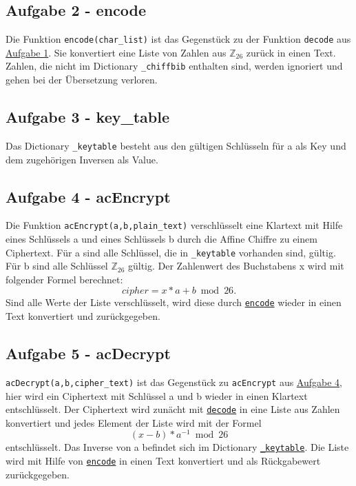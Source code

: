 \documentclass[12pt]{article}
\begin{document}
	\newpage
	
			
			
		\subsection{\label{ssec:Aufgabe2}Aufgabe 2 - encode}
			Die Funktion \texttt{encode(char\_list)} ist das Gegenst\"uck zu der Funktion \texttt{decode} aus \hyperref[ssec:Aufgabe1]{Aufgabe 1}. Sie konvertiert eine Liste von Zahlen aus \(\mathbb{Z}_{26}\) zur\"uck in einen Text. Zahlen, die nicht im Dictionary  \texttt{\_chiffbib} enthalten sind, werden ignoriert und gehen bei der \"Ubersetzung verloren.
			
			
		\subsection{\label{ssec:Aufgabe3}Aufgabe 3 - key\_table}
			Das Dictionary \texttt{\_keytable} besteht aus den g\"ultigen Schl\"usseln f\"ur a als Key und dem zugeh\"origen Inversen als Value.
			
			
		\subsection{\label{ssec:Aufgabe4}Aufgabe 4 - acEncrypt}
		Die Funktion \texttt{acEncrypt(a,b,plain\_text)} verschl\"usselt eine Klartext mit Hilfe eines Schl\"ussels a und eines Schl\"ussels b durch die Affine Chiffre zu einem Ciphertext.
F\"ur a sind alle Schl\"ussel, die in \texttt{\_keytable} vorhanden sind, g\"ultig. F\"ur b sind alle Schl\"ussel \(\mathbb{Z}_{26}\) g\"ultig. 
Der Zahlenwert des Buchstabens x wird mit folgender Formel berechnet:
\[ cipher = x * a + b \bmod 26.\]
Sind alle Werte der Liste verschl\"usselt, wird diese durch \hyperref[ssec:Aufgabe2]{\texttt{encode}} wieder in einen Text konvertiert und zur\"uckgegeben.
			
			
			
		\subsection{Aufgabe 5 - acDecrypt}
			\texttt{acDecrypt(a,b,cipher\_text)} ist das Gegenst\"uck zu \texttt{acEncrypt} aus \hyperref[ssec:Aufgabe4]{Aufgabe 4}, hier wird ein Ciphertext mit Schl\"ussel a und b wieder in einen Klartext entschl\"usselt.
Der Ciphertext wird zun\"acht mit \hyperref[ssec:Aufgabe1]{\texttt{decode}} in eine Liste aus Zahlen konvertiert und jedes Element der Liste wird mit der Formel
\[ (x - b) * a^{-1} \bmod 26\]
entschl\"usselt.
Das Inverse von a befindet sich im Dictionary \hyperref[ssec:Aufgabe3]{\texttt{\_keytable}}.
Die Liste wird mit Hilfe von \hyperref[ssec:Aufgabe2]{\texttt{encode}} in einen Text konvertiert und als R\"uckgabewert zur\"uckgegeben.
			
			
\end{document}
